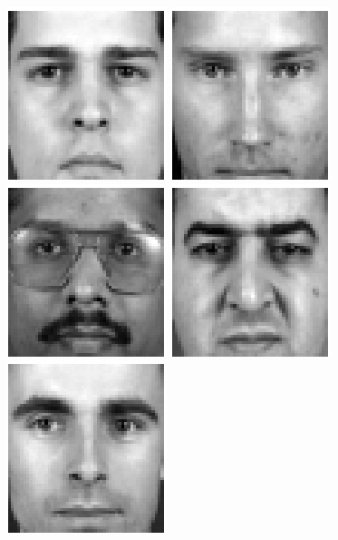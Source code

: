 \begin{figure}
\begin{center}
\includegraphics[scale=0.12]{ch4/figures/XM2VTS_1.png}
\includegraphics[scale=0.12]{ch4/figures/XM2VTS_2.png}
\includegraphics[scale=0.12]{ch4/figures/XM2VTS_3.png}
\includegraphics[scale=0.12]{ch4/figures/XM2VTS_4.png}
\includegraphics[scale=0.12]{ch4/figures/XM2VTS_5.png}

\end{center}
\end{figure}
